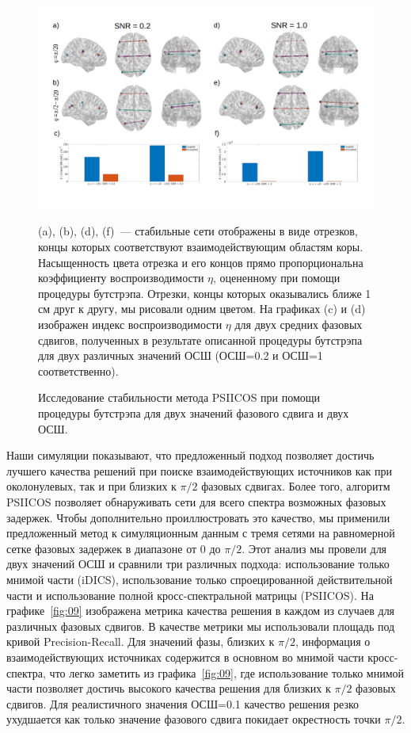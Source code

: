 \begin{figure}[!ht]
 \includegraphics[width=\textwidth]{../images/psiicos_paper/Figure8_hr.jpg}
 \caption{Исследование стабильности метода PSIICOS при помощи процедуры бутстрэпа для
 двух значений фазового сдвига и двух ОСШ.}\label{fig:08}
 (a), (b), (d), (f)~--- стабильные сети отображены в виде отрезков, концы которых
 соответствуют взаимодействующим областям коры. Насыщенность цвета отрезка
 и его концов прямо пропорциональна коэффициенту воспроизводимости $\eta$,
 оцененному при помощи процедуры бутстрэпа. Отрезки, концы которых
 оказывались ближе 1 см друг к другу, мы рисовали одним цветом.
 На графиках (c) и (d) изображен индекс воспроизводимости $\eta$ для
 двух средних фазовых сдвигов, полученных в результате описанной процедуры
 бутстрэпа для двух различных значений ОСШ (ОСШ=0.2 и ОСШ=1 соответственно).
\end{figure}%


Наши симуляции показывают, что предложенный подход позволяет достичь лучшего
качества решений при поиске взаимодействующих источников как при околонулевых,
так и при близких к $\pi/2$ фазовых сдвигах. Более того, алгоритм PSIICOS
позволяет обнаруживать сети для всего спектра возможных фазовых задержек. Чтобы
дополнительно проиллюстровать это качество, мы применили предложенный метод к
симуляционным данным с тремя сетями на равномерной сетке фазовых задержек в
диапазоне от 0 до $\pi/2$. Этот анализ мы провели для двух значений ОСШ и
сравнили три различных подхода: использование только мнимой части (iDICS),
использование только спроецированной действительной части и использование
полной кросс-спектральной матрицы (PSIICOS). На графике~\ref{fig:09}
изображена метрика качества решения в каждом из случаев для различных фазовых
сдвигов.  В качестве метрики мы использовали площадь под кривой
Precision-Recall. Для значений фазы, близких к $\pi/2$, информация о взаимодействующих
источниках содержится в основном во мнимой части кросс-спектра, что легко
заметить из графика~\ref{fig:09}, где использование только мнимой части позволяет достичь
высокого качества решения для близких к $\pi/2$ фазовых сдвигов. Для реалистичного
значения ОСШ=0.1 качество решения резко ухудшается как только значение фазового сдвига
покидает окрестность точки $\pi/2$.

